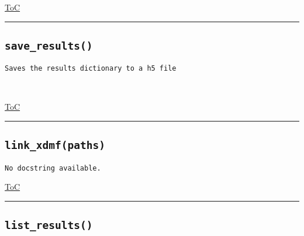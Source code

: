 \documentclass{article}
\begin{document}
\begin{flushright}

\hyperref[toc]{ToC}

\end{flushright}



\vspace{5mm}

\hrule

\subsection*{\texttt{save\_results()}}

\begin{lstlisting}[language=docstring]
Saves the results dictionary to a h5 file

    
\end{lstlisting}

\begin{flushright}

\hyperref[toc]{ToC}

\end{flushright}



\vspace{5mm}

\hrule

\subsection*{\texttt{link\_xdmf(paths)}}

\begin{lstlisting}[language=docstring]
No docstring available.
\end{lstlisting}

\begin{flushright}

\hyperref[toc]{ToC}

\end{flushright}



\vspace{5mm}

\hrule

\subsection*{\texttt{list\_results()}}
\end{document}
